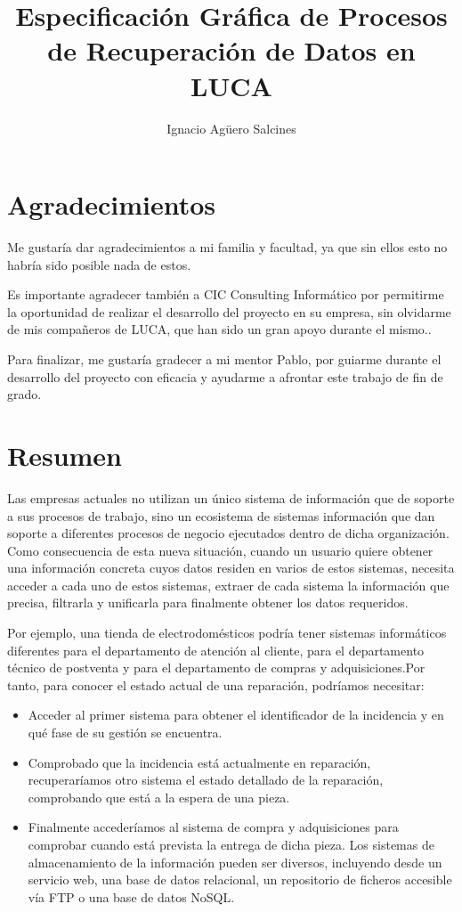 \documentclass[a4paper,12pt]{book}
\author{Ignacio Agüero Salcines}
\title{Especificación Gráfica de Procesos de Recuperación de Datos en LUCA}
\begin{document}
	
	
	\pagestyle{empty}
	\dominitoc
	\tableofcontents
	\cleardoublepage
	
	\pagestyle{plain}
	
	\listoffigures
	\listoftables
	\thispagestyle{empty}
	\cleardoublepage
	
	
	\chapter*{Agradecimientos}
	Me gustaría dar agradecimientos a mi familia y facultad, ya que sin ellos esto no habría sido posible nada de estos.
	
	 Es importante agradecer también a CIC Consulting Informático por permitirme la oportunidad de realizar el desarrollo del proyecto en su empresa, sin olvidarme de mis compañeros de LUCA, que han sido un gran apoyo durante el mismo..
	
	 Para finalizar, me gustaría gradecer a mi mentor Pablo, por guiarme durante el desarrollo del proyecto con eficacia y ayudarme a afrontar este trabajo de fin de grado.
	\cleardoublepage
	
	\clearpage
	
	\chapter*{Resumen}
	Las empresas actuales no utilizan un único sistema de información que de soporte a sus procesos de trabajo, sino un  ecosistema de sistemas información que dan soporte a diferentes procesos de negocio ejecutados dentro de dicha organización. Como consecuencia de esta nueva situación, cuando un usuario	quiere obtener una información concreta cuyos datos residen en varios de estos
	sistemas, necesita acceder a cada uno de estos sistemas, extraer de cada sistema la información que precisa, filtrarla y unificarla para finalmente	obtener los datos requeridos.
	
	
	Por ejemplo, una tienda de electrodomésticos podría tener sistemas informáticos diferentes para el departamento de atención al cliente, para el departamento técnico de postventa y para el departamento de compras y adquisiciones.Por tanto, para conocer el estado actual de una reparación, podríamos necesitar:
		\begin{itemize}
			\item  Acceder al primer sistema para obtener el identificador de la incidencia y en qué fase de su gestión se encuentra.
			\item  Comprobado que la incidencia está actualmente en reparación, recuperaríamos otro sistema el estado detallado de la reparación, comprobando que está a la espera de una pieza.
			\item Finalmente accederíamos al sistema de compra y adquisiciones para comprobar cuando está prevista la entrega de dicha pieza. Los sistemas de almacenamiento de la información pueden ser diversos, incluyendo desde un servicio web, una base de datos relacional, un repositorio de ficheros accesible vía FTP o una base de datos NoSQL.
		\end{itemize}
	
\end{document}
